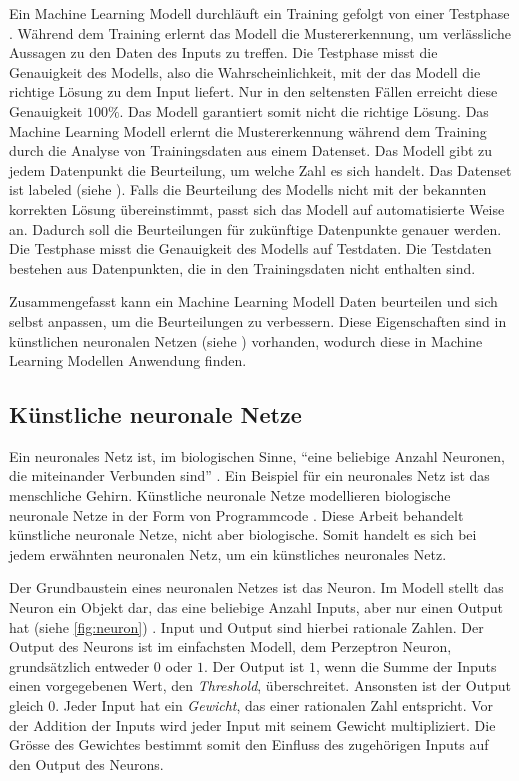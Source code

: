 Ein Machine Learning Modell durchläuft ein Training gefolgt von einer Testphase
\cite{noauthor_training_nodate}. Während dem Training erlernt das Modell die
Mustererkennung, um verlässliche Aussagen zu den Daten des Inputs zu treffen.
Die Testphase misst die Genauigkeit des Modells, also die Wahrscheinlichkeit,
mit der das Modell die richtige Lösung zu dem Input liefert. Nur in den seltensten
Fällen erreicht diese Genauigkeit $100\%$. Das Modell garantiert somit nicht die
richtige Lösung. Das Machine Learning Modell erlernt die Mustererkennung während
dem Training durch die Analyse von Trainingsdaten aus einem Datenset. Das Modell
gibt zu jedem Datenpunkt die Beurteilung, um welche Zahl es sich handelt. Das
Datenset ist labeled (siehe ). Falls die Beurteilung des
Modells nicht mit der bekannten korrekten Lösung übereinstimmt, passt sich das
Modell auf automatisierte Weise an. Dadurch soll die Beurteilungen für zukünftige Datenpunkte
genauer werden. Die Testphase misst die Genauigkeit des Modells auf Testdaten.
Die Testdaten bestehen aus Datenpunkten, die in den Trainingsdaten nicht
enthalten sind.
 
Zusammengefasst kann ein Machine Learning Modell Daten beurteilen und sich
selbst anpassen, um die Beurteilungen zu verbessern. Diese Eigenschaften sind in
künstlichen neuronalen Netzen (siehe ) vorhanden, wodurch
diese in Machine Learning Modellen Anwendung finden.
 
\subsection{Künstliche neuronale Netze}\label{sub:t_ml_nn} Ein neuronales Netz
ist, im biologischen Sinne, ``eine beliebige Anzahl Neuronen, die miteinander
Verbunden sind'' \cite{noauthor_neuronales_2021}. Ein Beispiel für ein neuronales
Netz ist das menschliche Gehirn. Künstliche neuronale Netze modellieren
biologische neuronale Netze in der Form von Programmcode
\cite{noauthor_artificial_nodate}. Diese Arbeit behandelt künstliche neuronale
Netze, nicht aber biologische. Somit handelt es sich bei jedem erwähnten
neuronalen Netz, um ein künstliches neuronales Netz.
 
Der Grundbaustein eines neuronalen Netzes ist das Neuron. Im Modell stellt das
Neuron ein Objekt dar, das eine beliebige Anzahl Inputs, aber nur einen Output
hat (siehe \autoref{fig:neuron}) \cite{pramoditha_concept_2021}. Input und
Output sind hierbei rationale Zahlen. Der Output des Neurons ist im einfachsten
Modell, dem Perzeptron Neuron, grundsätzlich entweder $0$ oder $1$. Der Output ist
$1$, wenn die Summe der Inputs einen vorgegebenen Wert, den \emph{Threshold},
überschreitet. Ansonsten ist der Output gleich $0$. Jeder Input hat ein
\emph{Gewicht}, das einer rationalen Zahl entspricht. Vor der Addition der
Inputs wird jeder Input mit seinem Gewicht multipliziert. Die Grösse des
Gewichtes bestimmt somit den Einfluss des zugehörigen Inputs auf den Output des
Neurons. \cite{nielsen_neural_2015}\cite{simplilearn_what_2021}

